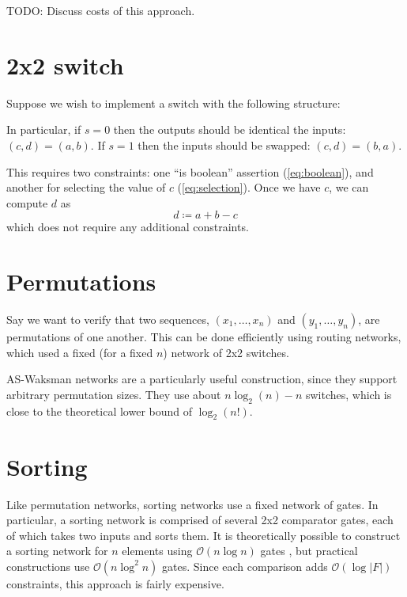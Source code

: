 \documentclass{article}
\begin{document}
TODO: Discuss costs of this approach.


\section{2x2 switch}

Suppose we wish to implement a switch with the following structure:
\begin{center}
\end{center}
In particular, if $s = 0$ then the outputs should be identical the inputs: $(c, d) = (a, b)$. If $s = 1$ then the inputs should be swapped: $(c, d) = (b, a)$.

This requires two constraints: one ``is boolean'' assertion (\autoref{eq:boolean}), and another for selecting the value of $c$ (\autoref{eq:selection}). Once we have $c$, we can compute $d$ as
\begin{equation}
  d \coloneqq a + b - c
\end{equation}
which does not require any additional constraints.


\section{Permutations} \label{sec:permutations}

Say we want to verify that two sequences, $(x_1, \dots, x_n)$ and $(y_1, \dots, y_n)$, are permutations of one another. This can be done efficiently using routing networks, which used a fixed (for a fixed $n$) network of 2x2 switches.

AS-Waksman networks \cite{beauquier2002arbitrary} are a particularly useful construction, since they support arbitrary permutation sizes. They use about $n \log_2(n) - n$ switches, which is close to the theoretical lower bound of $\log_2(n!)$.


\section{Sorting}

Like permutation networks, sorting networks use a fixed network of gates. In particular, a sorting network is comprised of several 2x2 comparator gates, each of which takes two inputs and sorts them. It is theoretically possible to construct a sorting network for $n$ elements using $\mathcal{O}(n \log n)$ gates \cite{ajtai19830}, but practical constructions use $\mathcal{O}(n \log^2 n)$ gates. Since each comparison adds $\mathcal{O}(\log |F|)$ constraints, this approach is fairly expensive.
\end{document}
